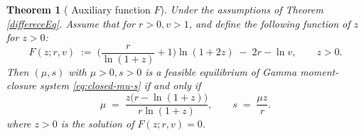 \documentclass[10pt,a4paper]{amsart}
\newtheorem{theorem}{Theorem}
\begin{document}
\begin{theorem}[ Auxiliary function $F$]\label{auxi} Under the assumptions of Theorem \ref{differeceEq}. Assume that for $r>0, v>1$, and  define the following function of $z$ for \(z>0\): 
\begin{equation}\label{F1}
F(z;r,v)\;:=\;\Big(\frac{r}{\ln(1+z)}+1\Big)\ln(1+2z)\;-\;2r-\ln v,
\qquad z>0. 
\end{equation}
Then \((\mu,s)\) with $\mu>0,s>0$ is a feasible equilibrium  of Gamma moment-closure system \eqref{eq:closed-mu-s} if and only if
\begin{equation}\label{F2}
\mu \;=\; \frac{z\big(r-\ln(1+z)\big)}{r\ln(1+z)},
\qquad
s \;=\; \frac{\mu z}{r}.
\end{equation}
where $z>0$ is the solution of $F(z;r,v)=0$.
\end{theorem}
\end{document}
